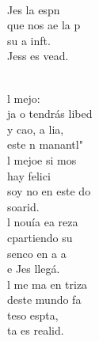 \documentclass[12pt]{article}
\begin{document}
\begin{multicols*}{2}
\begin{cancion}%
	\begin{chorus}%
	       \\
	 Jes la espn\\
	que nos ae la p\\
	 su a inft.\\
	Jess es vead.\\
	\end{chorus}%
	\jump\\
	l mejo:\\
	ja o tendrás libed\\
	y cao, a lia, \\
	 este n manantl"\\
	l mejoe si mos\\
	 hay felici\\
	 soy no en este do\\
	 soarid.\\
	l nouía ea reza\\
	cpartiendo su \\
	 senco en a a \\
	e Jes llegá.\\
	l me ma en triza\\
	deste mundo fa\\
	 teso espta, \\
	ta es realid.\\
\end{cancion}%


\end{multicols*}
\end{document}
